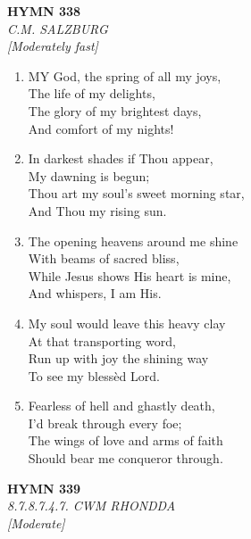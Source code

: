 \documentclass[11pt,a4paper]{article}
\begin{document}
\newpage
\begin{center}
    {\Large \textbf{HYMN 338}}
    \\
    \textit{C.M. SALZBURG}
    \\
    \textit{\small [Moderately fast]}
\end{center}
\vspace{1em}

\begin{enumerate}
    \item MY God, the spring of all my joys, \\
        The life of my delights, \\
        The glory of my brightest days, \\
        And comfort of my nights!

    \item In darkest shades if Thou appear, \\
        My dawning is begun; \\
        Thou art my soul's sweet morning star, \\
        And Thou my rising sun.

    \item The opening heavens around me shine \\
        With beams of sacred bliss, \\
        While Jesus shows His heart is mine, \\
        And whispers, I am His.

    \item My soul would leave this heavy clay \\
        At that transporting word, \\
        Run up with joy the shining way \\
        To see my bless\`ed Lord.

    \item Fearless of hell and ghastly death, \\
        I'd break through every foe; \\
        The wings of love and arms of faith \\
        Should bear me conqueror through.

\end{enumerate}

\newpage
\begin{center}
    {\Large \textbf{HYMN 339}}
    \\
    \textit{8.7.8.7.4.7. CWM RHONDDA}
    \\
    \textit{\small [Moderate]}
\end{center}
\vspace{1em}
\end{document}
